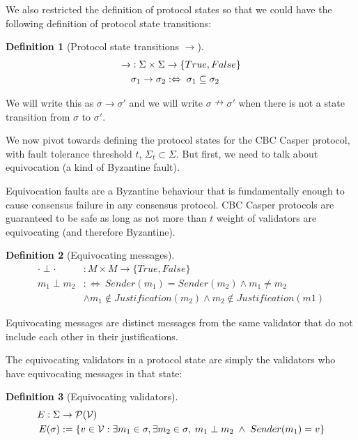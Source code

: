 \documentclass{article}
\theoremstyle{definition}
\newtheorem{defn}{Definition}[section]
\begin{document}
We also restricted the definition of protocol states so that we could have the following definition of protocol state transitions:

\begin{defn}[Protocol state transitions $\to$]
\begin{align}
\to &: \Sigma \times \Sigma \to \{True,False\} \\
&\sigma_1 \to \sigma_2 :\Leftrightarrow \hspace{1mm} \sigma_1 \subseteq \sigma_2
\end{align}
\end{defn}


We will write this as $\sigma \rightarrow \sigma'$ and we will write $\sigma \nrightarrow \sigma'$ when there is not a state transition from $\sigma$ to $\sigma'$.


We now pivot towards defining the protocol states for the CBC Casper protocol, with fault tolerance threshold $t$, $\Sigma_t \subset \Sigma$. But first, we need to talk about equivocation (a kind of Byzantine fault).

Equivocation faults are a Byzantine behaviour that is fundamentally enough to cause consensus failure in any consensus protocol. CBC Casper protocols are guaranteed to be safe as long as not more than $t$ weight of validators are equivocating (and therefore Byzantine).

\begin{defn}[Equivocating messages]
\begin{align}
  \cdot \perp \cdot &: M \times M \to \{True,False\}\\
  m_1 \perp m_2 &:\Leftrightarrow ~ Sender(m_1) = Sender(m_2) \land m_1 \neq m_2 \\
  &\land m_1 \notin Justification(m_2) \land m_2 \notin Justification(m1)
  \end{align}
\end{defn}

Equivocating messages are distinct messages from the same validator that do not include each other in their justifications.

The equivocating validators in a protocol state are simply the validators who have equivocating messages in that state:

\begin{defn}[Equivocating validators]
\begin{align}
E: \Sigma &\to \mathcal{P}(\mathcal{V}) \\
E(\sigma) &:= \{v \in \mathcal{V} : \exists m_1 \in \sigma, \exists m_2 \in \sigma , \hspace{1mm} m_1 \perp m_2 \hspace{1mm} \land \hspace{1mm} Sender(m_1) = v \}
\end{align}
\end{defn}
\end{document}
